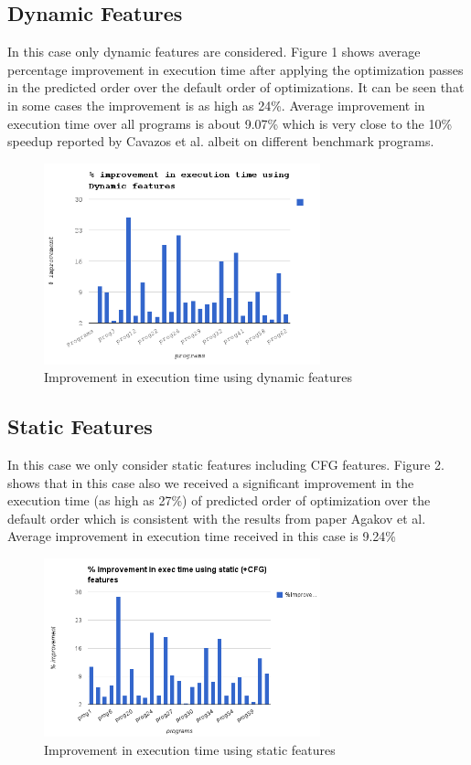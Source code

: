 \documentclass[10pt]{sigplanconf}
\begin{document}
\subsection {Dynamic Features}
In this case only dynamic features are considered. Figure 1 shows average percentage improvement in execution time after applying the optimization passes in the predicted order over the default order of optimizations. It can be seen that in some cases the improvement is as high as 24\%. Average improvement in execution time over all programs is about 9.07\% which is very close to the 10\% speedup reported by Cavazos et al. \cite{c7} albeit on different benchmark programs.


\begin{figure}[ht!]
\centering
\includegraphics[width=80mm]{dynamic_exec_time.png}
\caption{Improvement in execution time using dynamic features}
\label{overflow}
\end{figure}


\subsection {Static Features}
In this case we only consider static features including CFG features. Figure 2. shows that in this case also we received a significant improvement in the execution time (as high as 27\%) of predicted order of optimization over the default order which is consistent with the results from paper Agakov et al.\cite{c5} Average improvement in execution time received in this case is 9.24\%

\begin{figure}[ht!]
\centering
\includegraphics[width=80mm]{static_features.png}
\caption{Improvement in execution time using static features}
\label{overflow}
\end{figure}
\end{document}
